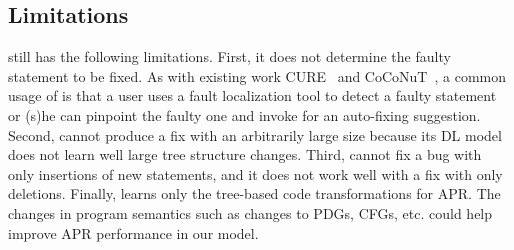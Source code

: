 \subsection{Limitations}
\label{sec:limitations}

{\tool} still has the following limitations. First, it does not
determine the faulty statement to be fixed. As with existing work
CURE~\cite{cure-icse21} and CoCoNuT~\cite{lutellier2020coconut}, a
common usage of {\tool} is that a user uses a fault localization tool
to detect a faulty statement or (s)he can pinpoint the faulty one and
invoke {\tool} for an auto-fixing suggestion. Second, {\tool} cannot
produce a fix with an arbitrarily large size because its DL model does
not learn well large tree structure changes. Third, {\tool} cannot fix
a bug with only insertions of new statements, and it does not work
well with a fix with only deletions.
Finally, {\tool} learns only the tree-based code transformations for
APR. The changes in program semantics such as changes to PDGs, CFGs,
etc. could help improve APR performance in our model.
